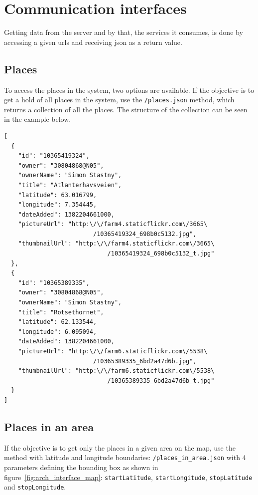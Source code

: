 \documentclass[11pt]{book}
\begin{document}
\section{Communication interfaces}\label{sec:arch_communicationinterfaces}
Getting data from the server and by that, the services it consumes, is done by accessing a given \glspl{url} and receiving \gls{json} as a return value.

\subsection{Places}\label{placesjson}
To access the places in the system, two options are available.
If the objective is to get a hold of all places in the system, use the \texttt{/places.json} method, which returns a collection of all the places. The structure of the collection can be seen in the example below.

\begin{lstlisting}[frame=single]
[
  {
    "id": "10365419324",
    "owner": "30804868@N05",
    "ownerName": "Simon Stastny",
    "title": "Atlanterhavsveien",
    "latitude": 63.016799,
    "longitude": 7.354445,
    "dateAdded": 1382204661000,
    "pictureUrl": "http:\/\/farm4.staticflickr.com\/3665\
                         /10365419324_698b0c5132.jpg",
    "thumbnailUrl": "http:\/\/farm4.staticflickr.com\/3665\
                             /10365419324_698b0c5132_t.jpg"
  },
  {
    "id": "10365389335",
    "owner": "30804868@N05",
    "ownerName": "Simon Stastny",
    "title": "Rotsethornet",
    "latitude": 62.133544,
    "longitude": 6.095094,
    "dateAdded": 1382204661000,
    "pictureUrl": "http:\/\/farm6.staticflickr.com\/5538\
                         /10365389335_6bd2a47d6b.jpg",
    "thumbnailUrl": "http:\/\/farm6.staticflickr.com\/5538\
                             /10365389335_6bd2a47d6b_t.jpg"
  }
]
\end{lstlisting}

\subsection{Places in an area}
If the objective is to get only the places in a given area on the map, use the method with latitude and longitude boundaries: \texttt{/places\_in\_area.json} with 4 parameters defining the bounding box as shown in figure~\ref{fig:arch_interface_map}: \texttt{startLatitude}, \texttt{startLongitude}, \texttt{stopLatitude} and \texttt{stopLongitude}.
\end{document}
